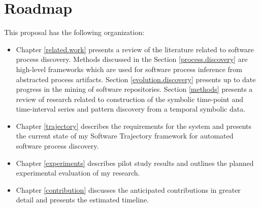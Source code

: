 \section{Roadmap}
This proposal has the following organization:
\begin{itemize}
	\item Chapter \ref{related.work} presents a review of the literature related to software process discovery. Methods discussed in the Section \ref{process.discovery} are high-level frameworks which are used for software process inference from abstracted process artifacts. Section \ref{evolution.discovery} presents up to date progress in the mining of software repositories. Section \ref{methods} presents a review of research related to construction of the symbolic time-point and time-interval series and pattern discovery from a temporal symbolic data.
	\item Chapter \ref{trajectory} describes the requirements for the system and presents the current state of my Software Trajectory framework for automated software process discovery.
	\item Chapter \ref{experiments} describes pilot study results and outlines the planned experimental evaluation of my research.
	\item Chapter \ref{contribution} discusses the anticipated contributions in greater detail and presents the estimated timeline.
\end{itemize}
